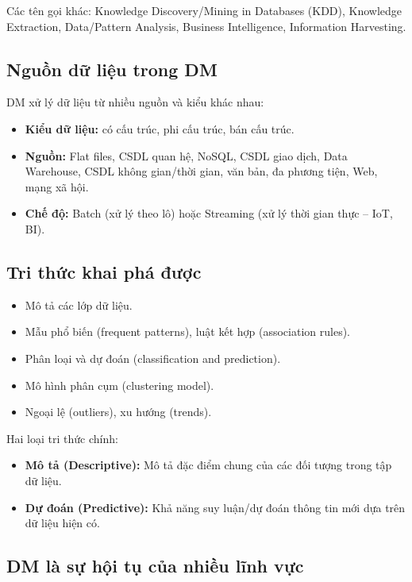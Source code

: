 \documentclass[10pt]{article}
\begin{document}
Các tên gọi khác: Knowledge Discovery/Mining in Databases (KDD), Knowledge Extraction, Data/Pattern Analysis, Business Intelligence, Information Harvesting.

\subsection{Nguồn dữ liệu trong DM}

DM xử lý dữ liệu từ nhiều nguồn và kiểu khác nhau:
\begin{itemize}
    \item \textbf{Kiểu dữ liệu:} có cấu trúc, phi cấu trúc, bán cấu trúc.
    \item \textbf{Nguồn:} Flat files, CSDL quan hệ, NoSQL, CSDL giao dịch, Data Warehouse, CSDL không gian/thời gian, văn bản, đa phương tiện, Web, mạng xã hội.
    \item \textbf{Chế độ:} Batch (xử lý theo lô) hoặc Streaming (xử lý thời gian thực -- IoT, BI).
\end{itemize}

\subsection{Tri thức khai phá được}

\begin{itemize}
    \item Mô tả các lớp dữ liệu.
    \item Mẫu phổ biến (frequent patterns), luật kết hợp (association rules).
    \item Phân loại và dự đoán (classification and prediction).
    \item Mô hình phân cụm (clustering model).
    \item Ngoại lệ (outliers), xu hướng (trends).
\end{itemize}

Hai loại tri thức chính:
\begin{itemize}
    \item \textbf{Mô tả (Descriptive):} Mô tả đặc điểm chung của các đối tượng trong tập dữ liệu.
    \item \textbf{Dự đoán (Predictive):} Khả năng suy luận/dự đoán thông tin mới dựa trên dữ liệu hiện có.
\end{itemize}

\subsection{DM là sự hội tụ của nhiều lĩnh vực}
\end{document}
